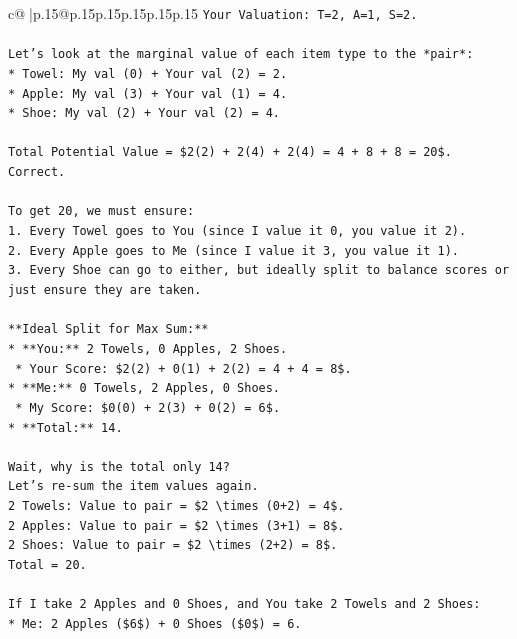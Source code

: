 \documentclass{article}
\begin{document}
{\begin{supertabular}{c@{$\;$}|p{.15\linewidth}@{}p{.15\linewidth}p{.15\linewidth}p{.15\linewidth}p{.15\linewidth}p{.15\linewidth}}
{{{\texttt{Your Valuation: T=2, A=1, S=2.} \\
\\ 
\texttt{Let's look at the marginal value of each item type to the *pair*:} \\
\texttt{*   Towel: My val (0) + Your val (2) = 2.} \\
\texttt{*   Apple: My val (3) + Your val (1) = 4.} \\
\texttt{*   Shoe: My val (2) + Your val (2) = 4.} \\
\\ 
\texttt{Total Potential Value = \$2(2) + 2(4) + 2(4) = 4 + 8 + 8 = 20\$. Correct.} \\
\\ 
\texttt{To get 20, we must ensure:} \\
\texttt{1.  Every Towel goes to You (since I value it 0, you value it 2).} \\
\texttt{2.  Every Apple goes to Me (since I value it 3, you value it 1).} \\
\texttt{3.  Every Shoe can go to either, but ideally split to balance scores or just ensure they are taken.} \\
\\ 
\texttt{**Ideal Split for Max Sum:**} \\
\texttt{*   **You:** 2 Towels, 0 Apples, 2 Shoes.} \\
\texttt{    *   Your Score: \$2(2) + 0(1) + 2(2) = 4 + 4 = 8\$.} \\
\texttt{*   **Me:** 0 Towels, 2 Apples, 0 Shoes.} \\
\texttt{    *   My Score: \$0(0) + 2(3) + 0(2) = 6\$.} \\
\texttt{*   **Total:** 14.} \\
\\ 
\texttt{Wait, why is the total only 14?} \\
\texttt{Let's re{-}sum the item values again.} \\
\texttt{2 Towels: Value to pair = \$2 \textbackslash{}times (0+2) = 4\$.} \\
\texttt{2 Apples: Value to pair = \$2 \textbackslash{}times (3+1) = 8\$.} \\
\texttt{2 Shoes: Value to pair = \$2 \textbackslash{}times (2+2) = 8\$.} \\
\texttt{Total = 20.} \\
\\ 
\texttt{If I take 2 Apples and 0 Shoes, and You take 2 Towels and 2 Shoes:} \\
\texttt{*   Me: 2 Apples (\$6\$) + 0 Shoes (\$0\$) = 6.} \\
}}}
\end{supertabular}}
\end{document}
